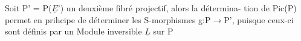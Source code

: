Soit P' = P($\underline{E}$') un deuxième fibré projectif, alors la détermina-%
tion de Pic(P) permet en prihcipe de déterminer les S-morphismes
g:P$\to$P', puisque ceux-ci sont définis par un Module inversible $\underline{L}$  sur P

